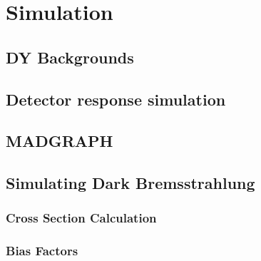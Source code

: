 \chapter{Simulation}
\label{simulation_chapter}
\section{DY Backgrounds}

\section{Detector response simulation}

\section{MADGRAPH}

\section{Simulating Dark Bremsstrahlung}

\subsection{Cross Section Calculation}

\subsection{Bias Factors}


